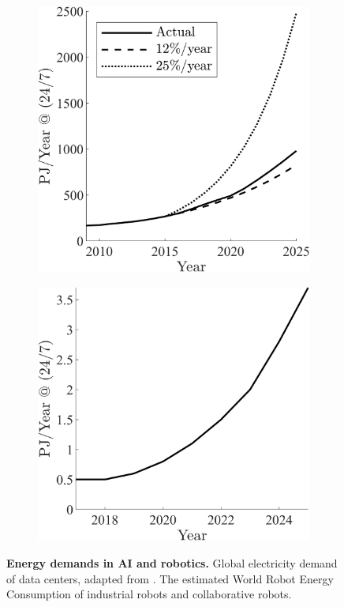 \documentclass[12pt]{article}
\begin{document}
\begin{figure}[!t]
\begin{subfigure}[t]{0.32\textwidth}
		\includegraphics[width=\textwidth]{ir_energy_projections.png} \label{fig:ir_energy}
	\end{subfigure}
	\hfill
	\begin{subfigure}[t]{0.32\textwidth}
		\subcaption{}
		\includegraphics[width=\textwidth]{cb_energy_projections.png} \label{fig:cobot_energy}
	\end{subfigure}	
	\hspace*{\fill}
	\caption[] {\label{fig:energy_demands_AI_robotics} \textbf{Energy demands in AI and robotics.}  Global electricity demand of data centers, adapted from \cite{andrae2015global}. The estimated World Robot Energy Consumption of  industrial robots and  collaborative robots.}
\end{figure}
\end{document}
